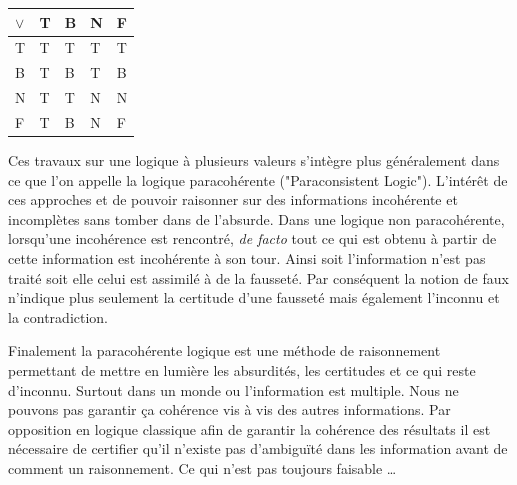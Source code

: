 \begin{refsegment}
\begin{table}[H]
\begin{subtable}{0.35\linewidth}
        \end{subtable}
        \begin{subtable}{0.35\linewidth}
            \centering
            \begin{tabular}{|>{\columncolor{LightCyan}}l|l|l|l|l|}
                \toprule
                \rowcolor{LightCyan}
                $\lor$ & T & B & N & F \\
                \midrule
                T       & T & T & T & T \\ \hline
                B       & T & B & T & B \\ \hline
                N       & T & T & N & N \\ \hline
                F       & T & B & N & F\\
                \bottomrule
            \end{tabular}
        \end{subtable}
    \end{table}

    Ces travaux sur une logique à plusieurs valeurs s'intègre plus généralement dans ce que l'on appelle la logique paracohérente ("Paraconsistent Logic"). L'intérêt de ces approches et de pouvoir raisonner sur des informations incohérente et incomplètes sans tomber dans de l'absurde. Dans une logique non paracohérente, lorsqu'une incohérence est rencontré, \textit{de facto} tout ce qui est obtenu à partir de cette information est incohérente à son tour. Ainsi soit l'information n'est pas traité soit elle celui est assimilé à de la fausseté. Par conséquent la notion de faux n'indique plus seulement la certitude d'une fausseté mais également l'inconnu et la contradiction.
    
    Finalement la paracohérente logique est une méthode de raisonnement permettant de mettre en lumière les absurdités, les certitudes et ce qui reste d'inconnu. Surtout dans un monde ou l'information est multiple. Nous ne pouvons pas garantir ça cohérence vis à vis des autres informations. Par opposition en logique classique afin de garantir la cohérence des résultats il est nécessaire de certifier qu'il n'existe pas d'ambiguïté dans les information avant de comment un raisonnement. Ce qui n'est pas toujours faisable \ldots
    

\end{refsegment}
